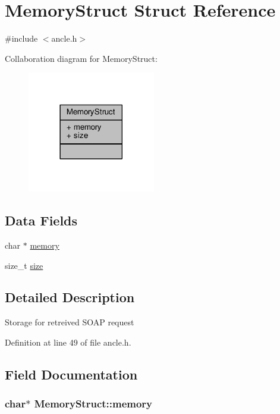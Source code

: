 \hypertarget{structMemoryStruct}{\section{Memory\-Struct Struct Reference}
\label{structMemoryStruct}
}


{\ttfamily \#include $<$ancle.\-h$>$}



Collaboration diagram for Memory\-Struct\-:\nopagebreak
\begin{figure}[H]
\begin{center}
\leavevmode
\includegraphics[width=158pt]{structMemoryStruct__coll__graph}
\end{center}
\end{figure}
\subsection*{Data Fields}
\begin{DoxyCompactItemize}
\item 
char $\ast$ \hyperlink{structMemoryStruct_a218a6fde0f367d44400542cbe523e943}{memory}
\item 
size\-\_\-t \hyperlink{structMemoryStruct_a79d6a7ad34b172f766c19d0846688440}{size}
\end{DoxyCompactItemize}


\subsection{Detailed Description}
Storage for retreived S\-O\-A\-P request 

Definition at line 49 of file ancle.\-h.



\subsection{Field Documentation}
\hypertarget{structMemoryStruct_a218a6fde0f367d44400542cbe523e943}{
\subsubsection[{memory}]{\setlength{\rightskip}{0pt plus 5cm}char$\ast$ Memory\-Struct\-::memory}}\label{structMemoryStruct_a218a6fde0f367d44400542cbe523e943}


